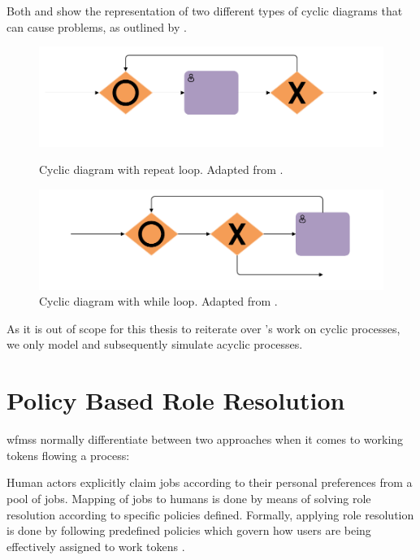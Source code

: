 Both  and  show the representation of two different types of cyclic diagrams that can cause problems, as outlined by \citet{Soerensen2005}.

\begin{figure}[!ht]
	\centering
	\begin{minipage}[b]{0.45\textwidth}
		\includegraphics[width=\textwidth]{img/repeat_loops}
		\caption{Cyclic diagram with repeat loop. Adapted from \citet[p. 12]{Soerensen2005}.}
		\label{fig:repeat_loops}
	\end{minipage}
	\hfill
	\begin{minipage}[b]{0.45\textwidth}
		\includegraphics[width=\textwidth]{img/while_loops}
		\caption{Cyclic diagram with while loop. Adapted from \citet[p. 12]{Soerensen2005}.}
		\label{fig:while_loops}
	\end{minipage}
\end{figure}

As it is out of scope for this thesis to reiterate over \citet{Soerensen2005}'s work on cyclic processes, we only model and subsequently simulate acyclic processes.

\section{Policy Based Role Resolution}
\label{sec:role_resolution_theory}

\glspl{wfms} normally differentiate between two approaches when it comes to working tokens flowing a process:

\begin{enumerate}
	 Human actors explicitly claim jobs according to their personal preferences from a pool of jobs.
	 Mapping of jobs to humans is done by means of solving role resolution according to specific policies defined. Formally, applying role resolution is done by following predefined policies which govern how users are being effectively assigned to work tokens \citep{Zeng2005}. 
\end{enumerate}

